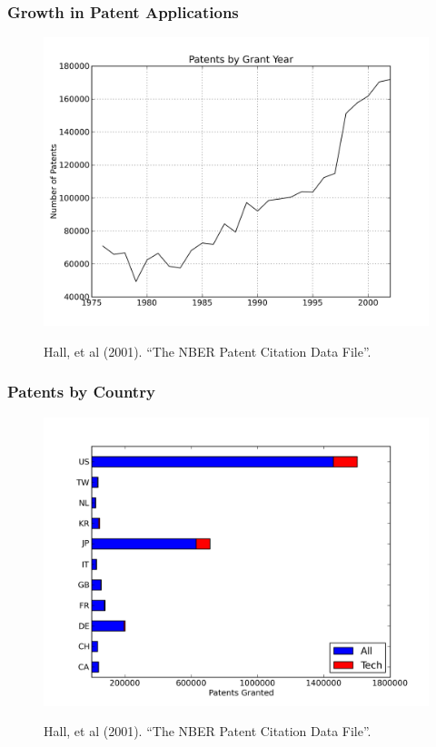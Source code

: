 \documentclass{beamer}
\begin{document}
\begin{frame}[t]\frametitle{Growth in Patent Applications} 
\fontsize{6pt}{7.2}\selectfont
\!\!\!\!\!\!\!\!\!\!\!\!\!\!
\begin{figure}[hb]
  \begin{center}
      \includegraphics[scale=.5]{grant_year.png}
      \label{fig:grant_year}
  \end{center}
  \!\!\!\!\!
  Hall, et al (2001). ``The NBER Patent Citation Data File''.
\end{figure}
\end{frame}

\begin{frame}[t]\frametitle{Patents by Country} 
\fontsize{6pt}{7.2}\selectfont
\!\!\!\!\!\!\!\!\!\!\!\!\!
\begin{figure}[hb]
  \begin{center}
    \includegraphics[scale=.5]{by_country.png}
    \label{fig:by_country}
  \end{center}
  \!\!\!\!\!
  Hall, et al (2001). ``The NBER Patent Citation Data File''.  
\end{figure}
\end{frame}
\end{document}
